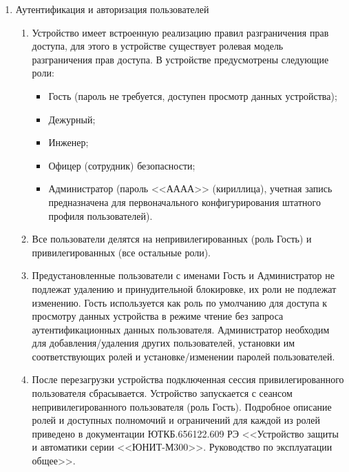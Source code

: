 \begin{enumerate}
\begin{enumerate}
\end{enumerate}

\item Аутентификация и авторизация пользователей
\begin{enumerate}

\item Устройство имеет встроенную реализацию правил разграничения прав доступа, для этого в устройстве существует ролевая модель разграничения прав доступа.
В устройстве предусмотрены следующие роли:
\begin{itemize}
\item Гость (пароль не требуется, доступен просмотр данных устройства);
\item Дежурный;
\item Инженер;
\item Офицер (сотрудник) безопасности;
\item Администратор (пароль <<АААА>> (кириллица), учетная запись предназначена для первоначального конфигурирования штатного профиля пользователей).
\end{itemize}

\item Все пользователи делятся на непривилегированных (роль Гость) и привилегированных (все остальные роли).

\item
Предустановленные пользователи с именами Гость и Администратор не подлежат удалению и принудительной блокировке, их роли не подлежат изменению. Гость используется как роль по умолчанию для доступа к просмотру данных устройства в режиме чтение без запроса аутентификационных данных пользователя. Администратор необходим для добавления/удаления других пользователей, установки им соответствующих ролей и установке/изменении паролей пользователей.
\item
После перезагрузки устройства подключенная сессия привилегированного пользователя сбрасывается. Устройство запускается с сеансом непривилегированного пользователя (роль Гость).
Подробное описание ролей и доступных полномочий и ограничений для каждой из ролей приведено в документации ЮТКБ.656122.609 РЭ <<Устройство защиты и автоматики серии <<ЮНИТ-М300>>. Руководство по эксплуатации общее>>.


\end{enumerate}
\end{enumerate}

